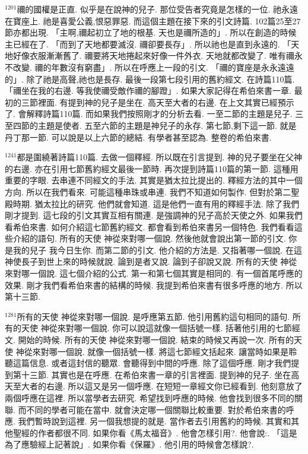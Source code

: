 \documentclass{book}
\begin{document}
$^{1201}$禰的國權是正直.
似乎是在說神的兒子.
那位受告者究竟是怎樣的一位.
祂永遠在寶座上.
祂是喜愛公義,恨惡罪惡.
而這個主題在接下來的引文詩篇.
102篇25至27節亦都出現.
「主啊,禰起初立了地的根基.
天也是禰所造的」.
所以在創造的時候主已經在了.
「而到了天地都要滅沒.
禰卻要長存」.
所以祂也是直到永遠的.
「天地好像衣服漸漸舊了.
禰要將天地捲起來好像一件外衣.
天地就都改變了.
唯有禰永不改變.
禰的年數沒有窮盡」.
所以在呼應上一段的引文.
「禰的寶座是永永遠遠的」.
除了祂是高聲,祂也是長存.
最後一段第七段引用的舊約經文.
在詩篇110篇.
「禰坐在我的右邊.
等我使禰受敵作禰的腳蹬」.
如果大家記得在希伯來書一章.
最初的三節裡面.
有提到神的兒子是坐在.
高天至大者的右邊.
在上文其實已經預示了.
會解釋詩篇110篇.
而如果我們按照剛才的分析去看.
一至二節的主題是兒子.
三至四節的主題是使者.
五至六節的主題是神兒子的永存.
第七節,剩下這一節.
就是丹丁那一節.
可以說是以上六節的總結.
有學者甚至認為.
整卷的希伯來書.

$^{1241}$都是圍繞著詩篇110篇.
去做一個釋經.
所以既在引言提到.
神的兒子要坐在父神的右邊.
亦在引用七節舊約經文最後一節時.
再次提到詩篇110篇的第一節.
這種用重要的字眼.
去串連不同經文的手法.
其實是猶太拉比提出的.
釋經方法的其中一個方向.
所以在我們看來.
可能這種串珠或串連.
我們不知道如何製作.
但對於第二聖殿時期.
猶太拉比的研究.
他們就會知道.
這是他們一直有用的釋經手法.
除了我們剛才提到.
這七段的引文其實互相有關連.
是強調神的兒子高於天使之外.
如果我們看希伯來書.
如何介紹這七節舊約經文.
都會看到希伯來書另一個特色.
我們看看這些介紹的語句.
所有的天使 神從來對哪一個說.
然後他就會說出第一節的引文.
你是我的兒子 我今日生你.
而第二節的引文.
他介紹的方法是.
又指著哪一個說.
在這神使長子到世上來的時候就說.
論到是者又說.
論到子卻說又說.
所有的天使 神從來對哪一個說.
這七個介紹的公式.
第一和第七個其實是相同的.
有一個首尾呼應的效果.
剛才我們看希伯來書的結構的時候.
我提到希伯來書有很多呼應的地方.
所以第十三節.

$^{1281}$所有的天使 神從來對哪一個說.
是呼應第五節.
他引用舊約這句相同的語句.
所有的天使 神從來對哪一個說.
你可以說這就像一個括號一樣.
括著他引用的七節經文.
開始的時候.
所有的天使 神從來對哪一個說.
結束的時候又再說一次.
所有的天使 神從來對哪一個說.
就像一個括號一樣.
將這七節經文括起來.
讓當時如果是聆聽這篇信息.
或者這封信的聽眾.
會聽得到中間的呼應.
除了這個呼應.
剛才我們提到第十三節.
其實也是在呼應.
在希伯來書一章的引言裡面.
提到神的兒子.
坐在高天至大者的右邊.
所以這又是另一個呼應.
在短短一章經文你已經看到.
他刻意放了兩個呼應在這裡.
所以當學者去研究.
希望找到呼應的時候.
他會找到很多不同的關聯.
而不同的學者可能在當中.
就會決定哪一個關聯比較重要.
對於希伯來書的呼應.
我們暫時說到這裡.
另一個我想提的就是.
當作者去引用舊約的時候.
其實和其他聖經的作者都很不同.
如果你看《馬太福音》.
他會怎樣引用?.
他會說:.
「這是為了應驗經上記著說」.
如果你看《保羅》.
他引用的時候會怎樣說?.
\end{document}
